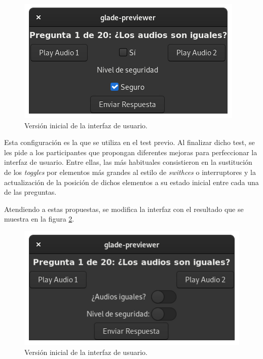 \documentclass[11pt,a4paper,twoside]{book}
\begin{document}
            \begin{figure}
                \begin{center}
                    \includegraphics[scale=.6]{../imagenes/uiIni.png}
                    \caption{Versión inicial de la interfaz de usuario.}
                    \label{fig:uiIni}
                \end{center}
            \end{figure}
            
            Esta configuración es la que se utiliza en el test previo. Al finalizar dicho test, se les pide a los participantes que propongan diferentes mejoras para perfeccionar la interfaz de usuario. Entre ellas, las más habituales consistieron en la sustitución de los \textit{toggles} por elementos más grandes al estilo de \textit{swithces} o interruptores y la actualización de la posición de dichos elementos a su estado inicial entre cada una de las preguntas.
            
            Atendiendo a estas propuestas, se modifica la interfaz con el resultado que se muestra en la figura \ref{fig:uiFin}.
            
            \begin{figure}
                \begin{center}
                    \includegraphics[scale=.6]{../imagenes/interFin.png}
                    \caption{Versión inicial de la interfaz de usuario.}
                    \label{fig:uiFin}
                \end{center}
            \end{figure}
            
\end{document}
